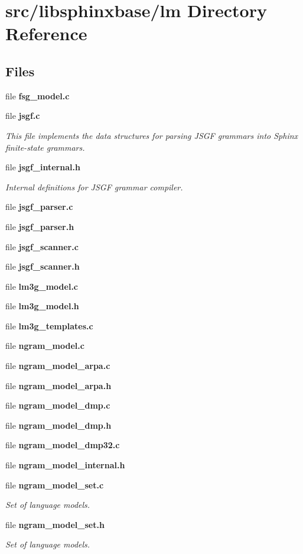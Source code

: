 \section{src/libsphinxbase/lm Directory Reference}
\label{dir_60aae0458aa1ecc8feb93296b73d98ea}
\subsection*{Files}
\begin{DoxyCompactItemize}
\item 
file {\bfseries fsg\-\_\-model.\-c}
\item 
file {\bf jsgf.\-c}
\begin{DoxyCompactList}\small\item\em This file implements the data structures for parsing J\-S\-G\-F grammars into Sphinx finite-\/state grammars. \end{DoxyCompactList}\item 
file {\bf jsgf\-\_\-internal.\-h}
\begin{DoxyCompactList}\small\item\em Internal definitions for J\-S\-G\-F grammar compiler. \end{DoxyCompactList}\item 
file {\bfseries jsgf\-\_\-parser.\-c}
\item 
file {\bfseries jsgf\-\_\-parser.\-h}
\item 
file {\bfseries jsgf\-\_\-scanner.\-c}
\item 
file {\bfseries jsgf\-\_\-scanner.\-h}
\item 
file {\bfseries lm3g\-\_\-model.\-c}
\item 
file {\bfseries lm3g\-\_\-model.\-h}
\item 
file {\bfseries lm3g\-\_\-templates.\-c}
\item 
file {\bfseries ngram\-\_\-model.\-c}
\item 
file {\bfseries ngram\-\_\-model\-\_\-arpa.\-c}
\item 
file {\bfseries ngram\-\_\-model\-\_\-arpa.\-h}
\item 
file {\bfseries ngram\-\_\-model\-\_\-dmp.\-c}
\item 
file {\bfseries ngram\-\_\-model\-\_\-dmp.\-h}
\item 
file {\bfseries ngram\-\_\-model\-\_\-dmp32.\-c}
\item 
file {\bfseries ngram\-\_\-model\-\_\-internal.\-h}
\item 
file {\bf ngram\-\_\-model\-\_\-set.\-c}
\begin{DoxyCompactList}\small\item\em Set of language models. \end{DoxyCompactList}\item 
file {\bf ngram\-\_\-model\-\_\-set.\-h}
\begin{DoxyCompactList}\small\item\em Set of language models. \end{DoxyCompactList}\end{DoxyCompactItemize}
